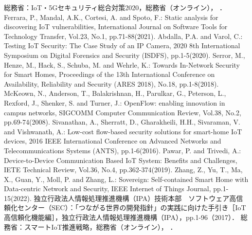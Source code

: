 \documentclass[Japanese]{dicomopapers}
\begin{document}
\begin{thebibliography}{10}
	 総務省：IoT・5Gセキュリティ総合対策2020，総務省（オンライン），
	．
	 Ferrara, P., Mandal, A.K., Cortesi, A. and Spoto, F.: Static analysis for discovering IoT vulnerabilities, International Journal on Software Tools for Technology Transfer, Vol.23, No.1, pp.71-88(2021).
	 Abdalla, P.A. and Varol, C.: Testing IoT Security: The Case Study of an IP Camera, 2020 8th International Symposium on Digital Forensics and Security (ISDFS), pp.1-5(2020).
	 Serror, M., Henze, M., Hack, S., Schuba, M. and Wehrle, K.: Towards In-Network Security for Smart Homes, Proceedings of the 13th International Conference on Availability, Reliability and Security (ARES 2018), No.18, pp.1-8(2018).
	 McKeown, N., Anderson, T., Balakrishnan, H., Parulkar, G., Peterson, L., Rexford, J., Shenker, S. and Turner, J.: OpenFlow: enabling innovation in campus networks, SIGCOMM Computer Communication Review, Vol.38, No.2, pp.69-74(2008).
	 Sivanathan, A., Sherratt, D., Gharakheili, H.H., Sivaraman, V. and Vishwanath, A.: Low-cost flow-based security solutions for smart-home IoT devices, 2016 IEEE International Conference on Advanced Networks and Telecommunications Systems (ANTS), pp.1-6(2016).
	 Pawar, P. and Trivedi, A.: Device-to-Device Communication Based IoT System: Benefits and Challenges, IETE Technical Review, Vol.36, No.4, pp.362-374(2019).
	 Zhang, Z., Yu, T., Ma, X., Guan, Y., Moll, P. and Zhang, L.: Sovereign: Self-contained Smart Home with Data-centric Network and Security, IEEE Internet of Things Journal, pp.1-15(2022).
	 独立行政法人情報処理推進機構（IPA）技術本部　ソフトウェア高信頼化センター（SEC）：「つながる世界の開発指針」の実践に向けた手引き［IoT高信頼化機能編］，独立行政法人情報処理推進機構（IPA），pp.1-96（2017）．
	 総務省：スマートIoT推進戦略，総務省（オンライン），
	．

\end{thebibliography}
\end{document}
